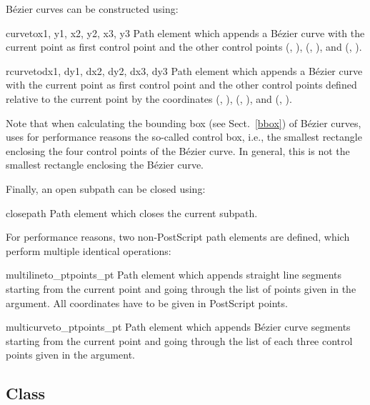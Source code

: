B\'ezier curves can be constructed using: \

\begin{classdesc}{curveto}{x1, y1, x2, y2, x3, y3}
Path element which appends a B\'ezier curve with
the current point as first control point and the other control points
(, ), (, ), and (, ). 
\end{classdesc}

\begin{classdesc}{rcurveto}{dx1, dy1, dx2, dy2, dx3, dy3}
Path element which appends a B\'ezier curve with
the current point as first control point and the other control points
defined relative to the current point by the coordinates
(, ), (, ), and (, ). 
\end{classdesc}

Note that when calculating the bounding box (see Sect.~\ref{bbox}) of
B\'ezier curves, \PyX{} uses for performance reasons the so-called
control box, i.e., the smallest rectangle enclosing the four control
points of the B\'ezier curve. In general, this is not the smallest
rectangle enclosing the B\'ezier curve. 

Finally, an open subpath can be closed using:

\begin{classdesc}{closepath}{}
Path element which closes the current subpath. 
\end{classdesc}

For performance reasons, two non-PostScript path elements are defined, 
which perform multiple identical operations:

\begin{classdesc}{multilineto_pt}{points_pt}
Path element which appends straight line segments starting from
the current point and going through the list of points given 
in the  argument. All coordinates have to 
be given in PostScript points. 
\end{classdesc}

\begin{classdesc}{multicurveto_pt}{points_pt}
Path element which appends B\'ezier curve segments starting from
the current point and going through the list of each three control
points given in the  argument. 
\end{classdesc}


\subsection{Class }

